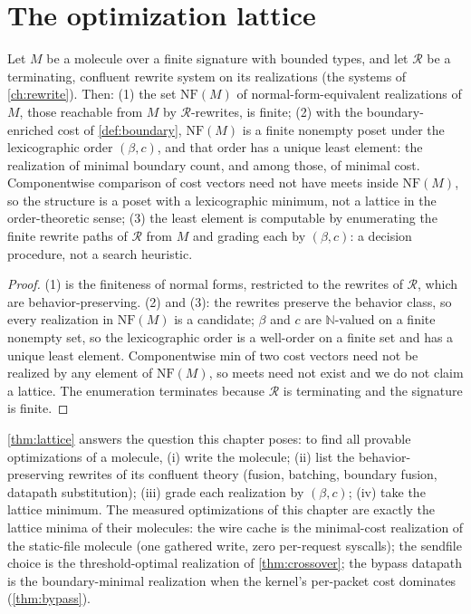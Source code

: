 \section{The optimization lattice}\label{sec:lattice}

\begin{theorem}\label{thm:59}\label{thm:lattice}
Let $M$ be a molecule over a finite signature with bounded types, and
let $\mathcal{R}$ be a terminating, confluent rewrite system on its
realizations (the systems of \autoref{ch:rewrite}). Then:
(1) the set $\mathrm{NF} (M)$ of normal-form-equivalent realizations of
$M$, those reachable from $M$ by $\mathcal{R}$-rewrites, is finite;
(2) with the boundary-enriched cost of \autoref{def:boundary},
$\mathrm{NF} (M)$ is a finite nonempty poset under the lexicographic
order $(\beta, c)$, and that order has a unique least element: the
realization of minimal boundary count, and among those, of minimal
cost. Componentwise comparison of cost vectors need not have meets
inside $\mathrm{NF} (M)$, so the structure is a poset with a
lexicographic minimum, not a lattice in the order-theoretic sense;
(3) the least element is computable by enumerating the finite rewrite
paths of $\mathcal{R}$ from $M$ and grading each by $(\beta, c)$: a
decision procedure, not a search heuristic.
\end{theorem}

\begin{proof}
(1) is the finiteness of normal forms, restricted to the rewrites of
$\mathcal{R}$, which are behavior-preserving. (2) and (3): the
rewrites preserve the behavior class, so every realization in
$\mathrm{NF} (M)$ is a candidate; $\beta$ and $c$ are $\mathbb{N}$-valued
on a finite nonempty set, so the lexicographic order is a well-order
on a finite set and has a unique least element. Componentwise min of
two cost vectors need not be realized by any element of
$\mathrm{NF} (M)$, so meets need not exist and we do not claim a
lattice. The enumeration terminates because $\mathcal{R}$ is
terminating and the signature is finite.
\end{proof}

\begin{remark}
\autoref{thm:lattice} answers the question this chapter poses: to find
all provable optimizations of a molecule, (i) write the molecule;
(ii) list the behavior-preserving rewrites of its confluent theory
(fusion, batching, boundary fusion, datapath substitution); (iii) grade
each realization by $(\beta, c)$; (iv) take the lattice minimum. The
measured optimizations of this chapter are exactly the lattice minima
of their molecules: the wire cache is the minimal-cost realization of
the static-file molecule (one gathered write, zero per-request
syscalls); the sendfile choice is the threshold-optimal realization of
\autoref{thm:crossover}; the bypass datapath is the boundary-minimal
realization when the kernel's per-packet cost dominates
(\autoref{thm:bypass}).
\end{remark}


